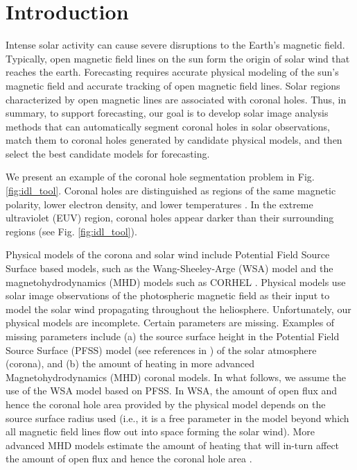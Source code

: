 \documentclass[journal]{IEEEtran}
\begin{document}
\section{Introduction}
Intense solar activity can cause severe disruptions
   to the Earth's magnetic field.
Typically, open magnetic field lines on the sun 
   form the origin of solar wind that reaches 
   the earth.   
Forecasting requires accurate physical modeling
   of the sun's magnetic field and accurate
   tracking of open magnetic field lines.   
Solar regions characterized by open magnetic
   lines are associated with coronal holes.
Thus, in summary, to support forecasting,
   our goal is to develop
   solar image analysis methods that 
   can automatically segment coronal holes in 
   solar observations, match them to coronal holes generated
   by candidate physical models, and then
   select the best candidate models for forecasting.



We present an example of the coronal hole
   segmentation problem in Fig. \ref{fig:idl_tool}.
Coronal holes are distinguished as regions of
   the same magnetic polarity, lower electron density, 
   and lower temperatures \cite{munro1972properties}.
In the extreme ultraviolet (EUV) region,
   coronal holes appear darker than their surrounding regions
   (see Fig. \ref{fig:idl_tool}).

Physical models of the corona and solar wind include Potential Field Source
        Surface based models, such as the Wang-Sheeley-Arge (WSA) model\cite{arge2004stream}
        and the magnetohydrodynamics (MHD) models such as CORHEL
        \cite{linker1999magnetohydrodynamic}.
Physical models use
   solar image observations of the photospheric magnetic
   field 
   as their input to model the solar wind propagating throughout the heliosphere. 
Unfortunately, our physical models are incomplete.
Certain parameters are missing. 
Examples of missing parameters include  
  (a) the source surface height in the Potential Field Source Surface (PFSS) model 
  (see references in \cite{arge2004stream}) 
  of the solar atmosphere (corona), and (b) the amount of heating in more advanced Magnetohydrodynamics (MHD) coronal models. 
In what follows, we assume the use of the WSA model based on PFSS.
In WSA, the amount of open flux and hence the coronal hole area provided by 
  the physical model depends on the source surface radius used (i.e., it is a free parameter in the model beyond which all magnetic field lines flow out into space forming the solar wind). 
More advanced MHD models estimate the amount of heating that will in-turn 
  affect the amount of open flux and hence the coronal hole area 
  \cite{Arge2000, Arge2003, Arge2004}.    
  
\end{document}
